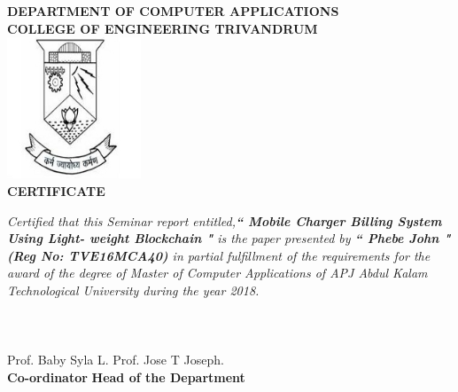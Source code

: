 \begin{titlepage}
\begin{center}
\textbf{DEPARTMENT OF COMPUTER APPLICATIONS}\\[0.5cm]
\textbf{ COLLEGE OF ENGINEERING TRIVANDRUM}\\
[0.5cm]
\vspace{1.2cm}
\includegraphics[width=0.30\textwidth]{./logo}\\
\vspace{0.8cm}
\textbf{CERTIFICATE}\\
\end{center}
\emph{Certified that this Seminar report entitled,\textbf{`` Mobile Charger Billing System Using Light- weight Blockchain "} is the paper presented by \textbf{`` Phebe  John "(Reg No: TVE16MCA40)} in partial fulfillment of the  requirements for the award of the degree of Master of Computer Applications of APJ Abdul Kalam Technological University during the year 2018.}\\\\\\\\
\vspace{0.5cm}
Prof. Baby Syla L.
\hspace{9.5cm}
Prof. Jose T Joseph.\\ 
\hspace{3.9cm} \textbf{Co-ordinator}
\hspace{9.2cm}
\textbf{Head of the Department}

\end{titlepage}
